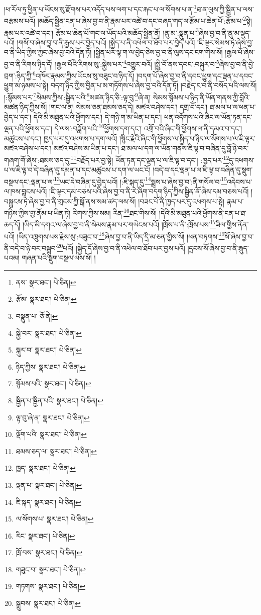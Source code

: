 །ཕ་རོལ་ཏུ་ཕྱིན་པ་ཡོངས་སུ་རྫོགས་པར་འདོད་པས་ལག་པ་དང་རྐང་པ་ལ་སོགས་པ་ན་\footnote{ནས་  སྣར་ཐང་།  པེ་ཅིན། }ཐ་ན་ལུས་ཀྱི་སྦྱིན་པ་ལས་བརྩམས་པའོ། །མཆོད་སྦྱིན་ངན་པ་ཞེས་བྱ་བ་ནི་རྣམ་པར་འཚེ་བ་དང་བཞད་གད་ལ་རྩོམ་པ་ཆེན་པོ་:རྩོམ་པ་\footnote{རྩོམ་  སྣར་ཐང་།  པེ་ཅིན། }སྟེ། རྣམ་པར་འཚེ་བ་དང་། རྩོམ་པ་ཆེན་པོ་གང་ལ་ཡོད་པའི་མཆོད་སྦྱིན་ནོ། །ནུ་མ་:སྣུན་པ་\footnote{བསྣུན་པ་  ཅོ་ནེ། }ཞེས་བྱ་བ་ནི་ནུ་མ་ལྡུད་པའོ། །གསོ་བ་ཞེས་བྱ་བ་ནི་རྒྱས་པར་བྱེད་པའོ། །སྐྱེད་པ་ནི་འཕེལ་བ་ཐོབ་པར་བྱེད་པའོ། །ཇི་ལྟར་སེམས་ཏེ་ཞེས་བྱ་བ་ནི་ཡིད་ཀྱིས་ཀྱང་ཞེས་བྱ་བའི་དོན་ཏོ། །སྦྱིན་པར་ལྟ་ག་ལ་བྱེད་ཅེས་བྱ་བ་ནི་ལུས་དང་ངག་གིས་སོ། །རྒྱལ་པོ་ཞེས་བྱ་བ་ནི་རིགས་ཉིད་དོ། །རྒྱལ་པོའི་རིགས་སུ་:སྐྱེས་པར་\footnote{སྐྱེ་བར་  སྣར་ཐང་།  པེ་ཅིན། }འགྱུར་བའོ། །སྤྱི་བོ་ནས་དབང་:བསྐུར་བ་\footnote{སྐུར་བ་  སྣར་ཐང་།  པེ་ཅིན། }ཞེས་བྱ་བ་ནི་བྱེ་བྲག་:ཉིད་ཀྱི་\footnote{ཉིད་ཀྱིས་  སྣར་ཐང་།  པེ་ཅིན། }འཁོར་རྣམས་ཀྱིས་ཡོངས་སུ་བཟུང་བ་ཉིད་དོ། །བདག་པོ་ཞེས་བྱ་བ་ནི་དབང་ཕྱུག་དང་ལྡན་པ་དབང་ཕྱུག་མ་ཉམས་པ་སྟེ། བདག་ཉིད་ཀྱིས་བྱིན་པ་མ་གཏོགས་པ་ཞེས་བྱ་བའི་དོན་ཏོ། །བརྗེད་ང་བ་ནི་བསོད་པའི་ལས་སོ། །:སྙོམས་པར་\footnote{སྙོམས་པའི་  སྣར་ཐང་།  པེ་ཅིན། }སེམས་ཀྱིས་:སྦྱིན་པའི་\footnote{སྦྱིན་པ་སྦྱིན་པའི་  སྣར་ཐང་།  པེ་ཅིན། }མཚན་ཉིད་ཅི་:ལྟ་བུ་\footnote{ལྟ་བུ་ཞེ་ན་  སྣར་ཐང་།  པེ་ཅིན། }ཞེ་ན། སེམས་སྙོམས་པ་ཉིད་ནི་ཡོན་གནས་ཀྱི་བློའི་མཚན་ཉིད་ཀྱིས་སོ། །གང་ལ་ན། སེམས་ཅན་ཐམས་ཅད་དེ། མཛའ་བཤེས་དང་། དགྲ་བོ་དང་། ཐ་མལ་པ་ལ་ཕན་པ་བྱེད་པ་དང་། དེའི་མི་མཐུན་པའི་ཕྱོགས་དང་། དེ་གཉི་ག་མ་ཡིན་པ་དང་། ཕན་འདོགས་པའི་ཞིང་ལ་ཡོན་ཏན་དང་ལྡན་པའི་ཕྱོགས་དང་། དེ་ལས་:བཟློག་པའི་\footnote{ལྡོག་པའི་  སྣར་ཐང་།  པེ་ཅིན། }ཕྱོགས་དག་དང་། འགྲོ་བའི་ཞིང་གི་ཕྱོགས་ལ་ནི་དམའ་བ་དང་། མཚུངས་པ་དང་། ཁྱད་པར་དུ་འཕགས་པ་དག་ལའོ། །སྙིང་རྗེའི་ཞིང་གི་ཕྱོགས་ལ་སྐྱིད་པ་ཉིད་ལ་སོགས་པ་ལ་ཇི་ལྟར་མཛའ་བཤེས་པ་དང་། མཛའ་བཤེས་མ་ཡིན་པ་དང་། ཐ་མལ་པ་དག་ལ་ཡོན་གནས་ཇི་ལྟ་བ་བཞིན་དུ་བློ་ཉེ་བར་གཞག་གོ་ཞེས་:ཐམས་ཅད་དུ་\footnote{ཐམས་ཅད་ལ་  སྣར་ཐང་།  པེ་ཅིན། }བརྗོད་པར་བྱ་སྟེ། ཡོན་ཏན་དང་ལྡན་པ་ལ་ཇི་ལྟ་བ་དང་། :ཁྱད་པར་\footnote{ཁྱད་  སྣར་ཐང་།  པེ་ཅིན། }དུ་འཕགས་པ་ལ་ཇི་ལྟ་བ་དེ་བཞིན་དུ་དམན་པ་དང་མཚུངས་པ་དག་ལ་ཡང་ངོ། །བདེ་བ་དང་ལྡན་པ་ལ་ཇི་ལྟ་བ་བཞིན་དུ་སྡུག་བསྔལ་དང་:ལྡན་པ་ལ་\footnote{ལྡན་པ་  སྣར་ཐང་།  པེ་ཅིན། }ཡང་དེ་བཞིན་དུ་བྱེད་པའོ། །:ཇི་སྐད་དུ་\footnote{ཇི་སྐད་  སྣར་ཐང་།  པེ་ཅིན། }སྨྲས་པ་ཞེས་བྱ་བ་:ནི་གསོལ་བ་\footnote{ལ་སོགས་པ་  སྣར་ཐང་།  པེ་ཅིན། }འདེབས་པ་ལ་ཁས་བླངས་པའོ། །ཇི་ལྟར་དམ་བཅས་པའི་ཞེས་བྱ་བ་ནི་རེ་ཞིག་བདག་ཉིད་ཀྱིས་སྦྱིན་ནོ་ཞེས་དམ་བཅས་པའོ། །བསྐྱུངས་ཏེ་ཞེས་བྱ་བ་ནི་གྲངས་ཀྱི་སྒོ་ནས་སམ་ཚད་ལས་སོ། །བཟང་པོ་ནི་ཁྱད་པར་དུ་འཕགས་པ་སྟེ། རྣམ་པ་གཉིས་ཀྱིས་གྱ་ནོམ་པ་ཡིན་ཏེ། རིགས་ཀྱིས་སམ། རིན་\footnote{རིང་  སྣར་ཐང་།  པེ་ཅིན། }ཐང་གིས་སོ། །དེའི་མི་མཐུན་པའི་ཕྱོགས་ནི་ངན་པ་ཐ་ཆད་དོ། །ཡིད་མི་དགའ་ལ་ཞེས་བྱ་བ་ནི་སེམས་རྣམ་པར་གཡེངས་པའོ། །ཁྲོས་པ་ནི་:ཁྲོས་པས་\footnote{ཁྲོ་བས་  སྣར་ཐང་།  པེ་ཅིན། }ཟིལ་གྱིས་ནོན་པའོ། །ཡིད་འཁྲུགས་པས་རྗེས་སུ་:བཟུང་བ་\footnote{གཟུང་བ་  སྣར་ཐང་།  པེ་ཅིན། }ཞེས་བྱ་བ་ནི་ཡིད་དྲི་མ་ཅན་གྱིས་སོ། །ཕན་བཏགས་\footnote{གཏགས་  སྣར་ཐང་།  པེ་ཅིན། }སོ་ཞེས་བྱ་བ་ནི་བདེ་བ་ཉེ་བར་བསྒྲུབ་\footnote{སྒྲུབས་  སྣར་ཐང་།  པེ་ཅིན། }པའོ། །སྐྱེད་དོ་ཞེས་བྱ་བ་ནི་འཕེལ་བ་ཐོབ་པར་བྱས་པའོ། །དྲངས་སོ་ཞེས་བྱ་བ་ནི་རྒུད་པའམ། གཞན་པའི་སྡུག་བསྔལ་ལས་སོ། །
